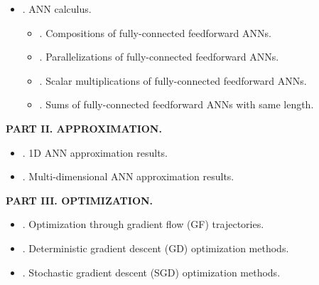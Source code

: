 \documentclass{article}
\newtheorem{definition}{Definition}
\begin{document}
\begin{enumerate}
\begin{itemize}
\begin{itemize}
\begin{itemize}
				\item {.4. Clipping activation.}
				\begin{definition}[Clipping (Cắt xén) activation function]
					Let $u\in[-\infty,\infty),v\in(u,\infty]$. Then denote by ${\frak c}_{u,v}:\mathbb{R}\to\mathbb{R}$ function which satisfies $\forall x\in\mathbb{R}$, ${\frak c}_{u,v}(x) = \max\{u,\min\{x,v\}\}$ \& call ${\frak c}_{u,v}$ {\rm$(u,v)$-clipping activation function}.
				\end{definition}
				{\sf Fig. 1.5: A plot of $(0,1)$-clipping activation function \& ReLU activation function.}
			\end{itemize}
			\item {. Fully-connected feedforward ANNs (structured description).}
			\item {. Convolutional ANNs (CNNs).}
			\item {. Residual ANNs (ResNets).}
			\item {. Recurrent ANNs (RNNs).}
			\item {. Further types of ANNs.}
		\end{itemize}
		\item {. ANN calculus.}
		\begin{itemize}
			\item {. Compositions of fully-connected feedforward ANNs.}
			\item {. Parallelizations of fully-connected feedforward ANNs.}
			\item {. Scalar multiplications of fully-connected feedforward ANNs.}
			\item {. Sums of fully-connected feedforward ANNs with same length.}
		\end{itemize}
	\end{itemize}
	{\bf PART II. APPROXIMATION.}
	\begin{itemize}
		\item {. 1D ANN approximation results.}
		\item {. Multi-dimensional ANN approximation results.}
	\end{itemize}
	{\bf PART III. OPTIMIZATION.}
	\begin{itemize}
		\item {. Optimization through gradient flow (GF) trajectories.}
		\item {. Deterministic gradient descent (GD) optimization methods.}
		\item {. Stochastic gradient descent (SGD) optimization methods.}

\end{itemize}
\end{enumerate}
\end{document}
